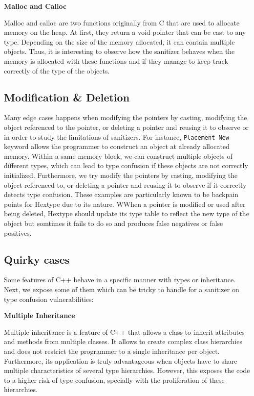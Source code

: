 \documentclass[a4paper,11pt,oneside]{report}
\begin{document}
\textbf{Malloc and Calloc}

\noindent{}Malloc and calloc are two functions originally from C that are used to allocate memory on the heap. At first, they
return a void pointer that can be cast to any type. Depending on the size of the memory allocated, it can contain multiple objects.
Thus, it is interesting to observe how the sanitizer behaves when the memory is allocated with these functions and if they manage
to keep track correctly of the type of the objects.

\subsection{Modification \& Deletion}

\noindent{}Many edge cases happens when modifying the pointers by casting, modifying the object referenced to the pointer, 
or deleting a pointer and reusing it to observe or in order to study the limitations of sanitizers. For instance, 
\texttt{Placement New} keyword allows the programmer to construct an object at already allocated memory. 
Within a same memory block, we can construct multiple objects of different types, which can lead to type confusion
if these objects are not correctly initialized. Furthermore, we try modify the pointers by casting, modifying the object referenced to, 
or deleting a pointer and reusing it to observe if it correctly detects type confusion. These examples are particularly known to 
be backpain points for Hextype due to its nature. WWhen a pointer is modified or used after being deleted, Hextype should update 
its type table to reflect the new type of the object but somtimes it fails to do so and produces false negatives or false positives.

\subsection{Quirky cases}

Some features of C++ behave in a specific manner with types or inheritance. Next, we expose some of them 
which can be tricky to handle for a sanitizer on type confusion vulnerabilities:

\textbf{Multiple Inheritance}

\noindent{}Multiple inheritance is a feature of C++ that allows a class to inherit attributes and methods from multiple classes.
It allows to create complex class hierarchies and does not restrict the programmer to a single inheritance per object. Furthermore,
its application is truly advantageous when objects have to share multiple characteristics of several type hierarchies. 
However, this exposes the code to a higher risk of type confusion, specially with the proliferation of these hierarchies.  
\end{document}
